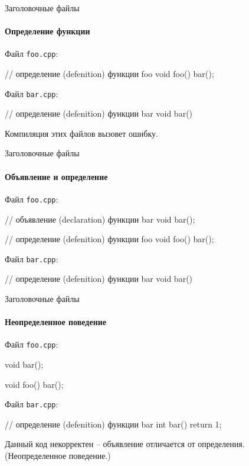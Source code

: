 \documentclass[9pt]{beamer}
\begin{document}
\begin{frame}[fragile]{Заголовочные файлы}
    \framesubtitle{Определение функции}
    Файл \texttt{foo.cpp}:
    \begin{cppcode}
        // определение (defenition) функции foo
        void foo()
        {
            bar();        
        }
    \end{cppcode}
        
    \vspace{2em}
    Файл \texttt{bar.cpp}:
    \begin{cppcode}
        // определение (defenition) функции bar
        void bar(){ }
    \end{cppcode}
    
    \vspace{2em}
    Компиляция этих файлов вызовет ошибку.
\end{frame}

\begin{frame}[fragile]{Заголовочные файлы}
\framesubtitle{Объявление  и определение}
    Файл \texttt{foo.cpp}:
    \begin{cppcode}
        // объявление (declaration) функции bar
        void bar();
        
        // определение (defenition) функции foo
        void foo()
        {
            bar();        
        }
    \end{cppcode}

    \vspace{2em}
    Файл \texttt{bar.cpp}:
    \begin{cppcode}
        // определение (defenition) функции bar
        void bar(){ }
    \end{cppcode}
\end{frame}


\begin{frame}[fragile]{Заголовочные файлы}
\framesubtitle{Неопределенное поведение}
    Файл \texttt{foo.cpp}:
    \begin{cppcode}
        void bar();
        
        void foo()
        {
            bar();        
        }
    \end{cppcode}

    \vspace{2em}
    Файл \texttt{bar.cpp}:
    \begin{cppcode}
        // определение (defenition) функции bar
        int bar(){ return 1; }
    \end{cppcode}

    \vspace{2em}
    Данный код некорректен -- объявление отличается от определения. (Неопределенное поведение.)
\end{frame}
\end{document}
